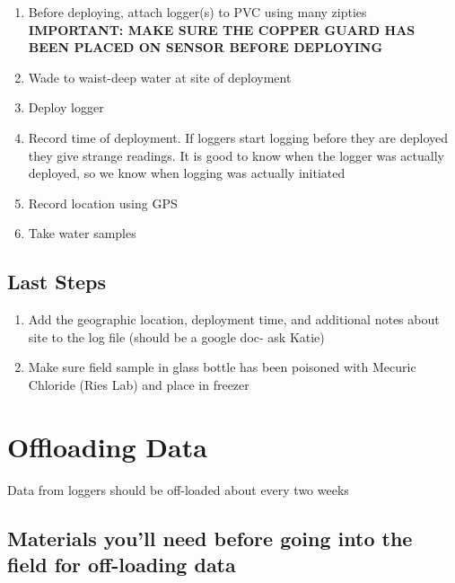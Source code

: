 \documentclass[
  letterpaper,
  DIV=11,
  numbers=noendperiod]{scrreprt}
\begin{document}
\begin{enumerate}
\def\labelenumi{\arabic{enumi}.}
\item
  Before deploying, attach logger(s) to PVC using many zipties
  \textbf{IMPORTANT: MAKE SURE THE COPPER GUARD HAS BEEN PLACED ON
  SENSOR BEFORE DEPLOYING}
\item
  Wade to waist-deep water at site of deployment
\item
  Deploy logger
\item
  Record time of deployment. If loggers start logging before they are
  deployed they give strange readings. It is good to know when the
  logger was actually deployed, so we know when logging was actually
  initiated
\item
  Record location using GPS
\item
  Take water samples
\end{enumerate}

\hypertarget{last-steps-1}{%
\subsection*{\texorpdfstring{\textbf{Last
Steps}}{Last Steps}}\label{last-steps-1}}

\begin{enumerate}
\def\labelenumi{\arabic{enumi}.}
\item
  Add the geographic location, deployment time, and additional notes
  about site to the log file (should be a google doc- ask Katie)
\item
  Make sure field sample in glass bottle has been poisoned with Mecuric
  Chloride (Ries Lab) and place in freezer
\end{enumerate}

\hypertarget{offloading-data-1}{%
\section*{\texorpdfstring{\textbf{Offloading
Data}}{Offloading Data}}\label{offloading-data-1}}

Data from loggers should be off-loaded about every two weeks

\hypertarget{materials-youll-need-before-going-into-the-field-for-off-loading-data-1}{%
\subsection*{\texorpdfstring{\textbf{Materials you'll need before going
into the field for off-loading
data}}{Materials you'll need before going into the field for off-loading data}}\label{materials-youll-need-before-going-into-the-field-for-off-loading-data-1}}
\end{document}
